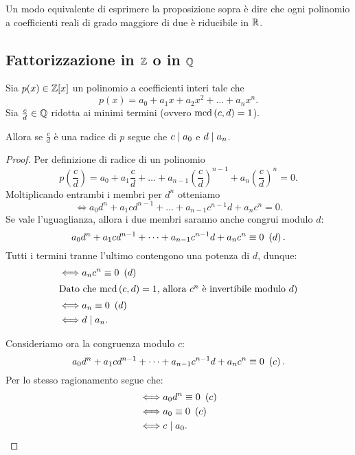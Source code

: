 Un modo equivalente di esprimere la proposizione sopra è dire che ogni polinomio a coefficienti reali di grado maggiore di due è riducibile in $\mathbb{R}$.

\subsection{Fattorizzazione in $\mathbb{Z}$ o in $\mathbb{Q}$}

\begin{proposition}
    Sia $p(x) \in \mathbb{Z}[x]$ un polinomio a coefficienti interi tale che \[
        p(x) = a_0 + a_1x + a_2x^2 + \dots + a_nx^n.    
    \] Sia $\frac{c}{d} \in \mathbb{Q}$ ridotta ai minimi termini (ovvero $\operatorname{mcd}\left(c, d\right) = 1$). 
    
    Allora se $\frac{c}{d}$ è una radice di $p$ segue che $c \mid a_0$ e $d \mid a_n$.
\end{proposition}
\begin{proof}
    Per definizione di radice di un polinomio \[
        p\left(\frac{c}{d}\right) = a_0 + a_1\frac{c}{d} + \dots + a_{n-1}\left(\frac{c}{d}\right)^{n-1} + a_n\left(\frac{c}{d}\right)^n = 0.
    \]
    Moltiplicando entrambi i membri per $d^n$ otteniamo \[
        \iff a_0d^n + a_1cd^{n-1} + \dots + a_{n-1}c^{n-1}d + a_nc^n = 0.
    \]
    Se vale l'uguaglianza, allora i due membri saranno anche congrui modulo $d$: \[
        a_0d^n + a_1cd^{n-1} + \dots + a_{n-1}c^{n-1}d + a_nc^n \equiv 0 \ \left(d\right).
    \]
    Tutti i termini tranne l'ultimo contengono una potenza di $d$, dunque:
    \begin{align*}
        \iff &a_nc^n \equiv 0 \ \left(d\right) \\
        \intertext{Dato che $\operatorname{mcd}\left(c, d\right) = 1$, allora $c^n$ è invertibile modulo $d$)}
        \iff &a_n \equiv 0 \ \left(d\right)\\
        \iff &d \mid a_n.
    \end{align*}

    Consideriamo ora la congruenza modulo $c$: \[
        a_0d^n + a_1cd^{n-1} + \dots + a_{n-1}c^{n-1}d + a_nc^n \equiv 0 \ \left(c\right).
    \]
    Per lo stesso ragionamento segue che:
    \begin{align*}
        \iff &a_0d^n \equiv 0 \ \left(c\right)\\
        \iff &a_0 \equiv 0 \ \left(c\right) \\
        \iff &c \mid a_0. \qedhere
    \end{align*}
\end{proof}

